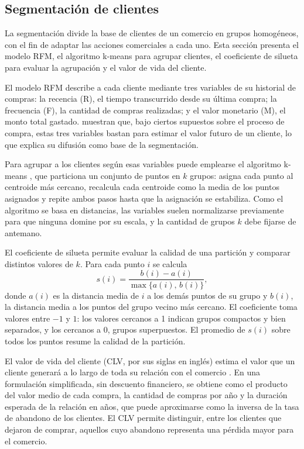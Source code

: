 \subsection{Segmentación de clientes}
\label{sec:segmentacion}

La segmentación divide la base de clientes de un comercio en grupos homogéneos, con el fin de adaptar las acciones comerciales a cada uno. Esta sección presenta el modelo RFM, el algoritmo k-means para agrupar clientes, el coeficiente de silueta para evaluar la agrupación y el valor de vida del cliente.

El modelo RFM describe a cada cliente mediante tres variables de su historial de compras: la recencia (R), el tiempo transcurrido desde su última compra; la frecuencia (F), la cantidad de compras realizadas; y el valor monetario (M), el monto total gastado. \textcite{Fader2005} muestran que, bajo ciertos supuestos sobre el proceso de compra, estas tres variables bastan para estimar el valor futuro de un cliente, lo que explica su difusión como base de la segmentación.

Para agrupar a los clientes según esas variables puede emplearse el algoritmo k-means \parencite{MacQueen1967}, que particiona un conjunto de puntos en $k$ grupos: asigna cada punto al centroide más cercano, recalcula cada centroide como la media de los puntos asignados y repite ambos pasos hasta que la asignación se estabiliza. Como el algoritmo se basa en distancias, las variables suelen normalizarse previamente para que ninguna domine por su escala, y la cantidad de grupos $k$ debe fijarse de antemano.

El coeficiente de silueta \parencite{Rousseeuw1987} permite evaluar la calidad de una partición y comparar distintos valores de $k$. Para cada punto $i$ se calcula
\[
s(i) = \frac{b(i) - a(i)}{\max\{a(i),\, b(i)\}},
\]
donde $a(i)$ es la distancia media de $i$ a los demás puntos de su grupo y $b(i)$, la distancia media a los puntos del grupo vecino más cercano. El coeficiente toma valores entre $-1$ y $1$: los valores cercanos a 1 indican grupos compactos y bien separados, y los cercanos a 0, grupos superpuestos. El promedio de $s(i)$ sobre todos los puntos resume la calidad de la partición.

El valor de vida del cliente (CLV, por sus siglas en inglés) estima el valor que un cliente generará a lo largo de toda su relación con el comercio \parencite{Gupta2006}. En una formulación simplificada, sin descuento financiero, se obtiene como el producto del valor medio de cada compra, la cantidad de compras por año y la duración esperada de la relación en años, que puede aproximarse como la inversa de la tasa de abandono de los clientes. El CLV permite distinguir, entre los clientes que dejaron de comprar, aquellos cuyo abandono representa una pérdida mayor para el comercio.

